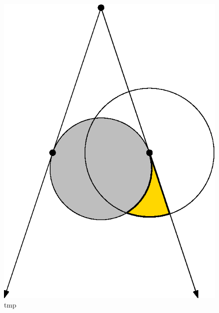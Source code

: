 \documentclass{article}
\begin{document}
\begin{figure}
  \centering
  \includegraphics{circle-diffract.eps}
  \caption{tmp}
\end{figure}
\end{document}
